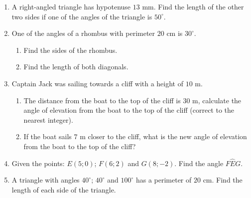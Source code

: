 \begin{eocexercises}{}
\begin{enumerate}[itemsep=6pt, label=\textbf{\arabic*}. ]
\item A right-angled triangle has hypotenuse $13$ mm. Find the length of the other two sides if one of the angles of the triangle is $50^{\circ}$.
\item One of the angles of a rhombus with perimeter $20$ cm is $30^{\circ}$. 
\begin{enumerate}[noitemsep, label=\textbf{(\alph*)} ]
\item Find the sides of the rhombus. 
\item Find the length of both diagonals. 
\end{enumerate} 
\item Captain Jack was sailing towards a cliff with a height of $10$ m. 
\begin{enumerate}[noitemsep, label=\textbf{(\alph*)} ] 
\item The distance from the boat to the top of the cliff is $30$ m, calculate the angle of elevation from the boat to the top of the cliff (correct to the nearest integer).
\item If the boat sails $7$ m closer to the cliff, what is the new angle of elevation from the boat to the top of the cliff? 
\end{enumerate} 
\item Given the points: $E(5;0)$; $F(6;2)$ and $G(8;-2)$. Find the angle $F\hat{E}G$. 
\item  A triangle with angles $40^{\circ}$; $40^{\circ}$ and $100^{\circ}$ has a perimeter of $20$ cm. Find the length of each side of the triangle. 

\end{enumerate}
\end{eocexercises}
